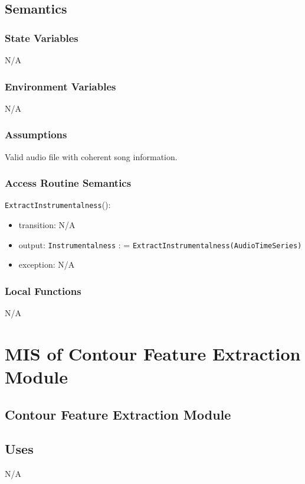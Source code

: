 \documentclass[12pt, titlepage]{article}
\begin{document}
\subsection{Semantics}

\subsubsection{State Variables}
N/A

\subsubsection{Environment Variables}
N/A

\subsubsection{Assumptions}
Valid audio file with coherent song information.

\subsubsection{Access Routine Semantics}

\noindent \texttt{ExtractInstrumentalness}():
\begin{itemize}
\item transition: N/A
\item output: \texttt{Instrumentalness} : = \texttt{ExtractInstrumentalness(Audio\textunderscore Time\textunderscore Series)}
\item exception: N/A
\end{itemize}

\subsubsection{Local Functions}
N/A

\section{MIS of Contour Feature Extraction Module} 

\subsection{Contour Feature Extraction Module}

\subsection{Uses}
N/A
\end{document}
